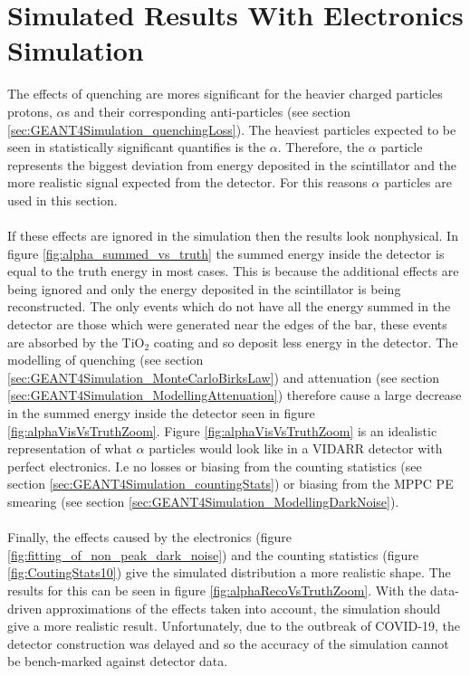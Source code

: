\section{Simulated Results With Electronics Simulation}\label{sec:GEANT4Simulation_resultsPhysicalElectronics}
The effects of quenching are mores significant for the heavier charged particles  protons, $\alpha$s and their corresponding anti-particles (see section \ref{sec:GEANT4Simulation_quenchingLoss}). The heaviest particles expected to be seen in statistically significant quantifies is the $\alpha$. Therefore, the $\alpha$ particle represents the biggest deviation from energy deposited in the scintillator and the more realistic signal expected from the detector. For this reasons $\alpha$ particles are used in this section.  
\\\\If these effects are ignored in the simulation then the results look nonphysical. In figure \ref{fig:alpha_summed_vs_truth} the summed energy inside the detector is equal to the truth energy in most cases. This is because the additional effects are being ignored and only the energy deposited in the scintillator is being reconstructed. The only events which do not have all the energy summed in the detector are those which were generated near the edges of the bar, these events are absorbed by the TiO$_2$ coating and so deposit less energy in the detector. The modelling of quenching (see section \ref{sec:GEANT4Simulation_MonteCarloBirksLaw}) and attenuation (see section \ref{sec:GEANT4Simulation_ModellingAttenuation}) therefore cause a large decrease in the summed energy inside the detector seen in figure \ref{fig:alphaVisVsTruthZoom}. Figure \ref{fig:alphaVisVsTruthZoom} is an idealistic representation of what $\alpha$ particles would look like in a VIDARR detector with perfect electronics. I.e no losses or biasing from the counting statistics (see section \ref{sec:GEANT4Simulation_countingStats}) or biasing from the MPPC PE smearing (see section \ref{sec:GEANT4Simulation_ModellingDarkNoise}).
\\\\Finally, the effects caused by the electronics (figure \ref{fig:fitting_of_non_peak_dark_noise}) and the counting statistics (figure \ref{fig:CoutingStats10}) give the simulated distribution a more realistic shape. The results for this can be seen in figure \ref{fig:alphaRecoVsTruthZoom}. With the data-driven approximations of the effects taken into account, the simulation should give a more realistic result. Unfortunately, due to the outbreak of COVID-19, the detector construction was delayed and so the accuracy of the simulation cannot be bench-marked against detector data. 


